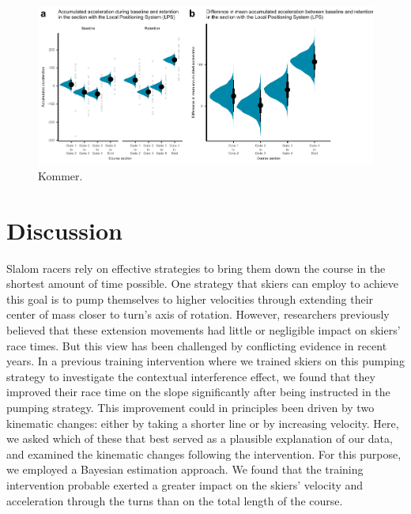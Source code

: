 \documentclass{article}
\begin{document}
\begin{figure}[H]
\centering
\includegraphics{figurer/figure_acc_acc.pdf}
\caption{Kommer.}\label{fig: accaccum}
\end{figure}

\section{Discussion}

Slalom racers rely on effective strategies to bring them down the course in the shortest amount of time possible. One strategy that skiers can employ to achieve this goal is to pump themselves to higher velocities through extending their center of mass closer to turn's axis of rotation. However, researchers previously believed that these extension movements had little or negligible impact on skiers' race times. But this view has been challenged by conflicting evidence in recent years. In a previous training intervention where we trained skiers on this pumping strategy to investigate the contextual interference effect, we found that they improved their race time on the slope significantly after being instructed in the pumping strategy. This improvement could in principles been driven by two kinematic changes: either by taking a shorter line or by increasing velocity. Here, we asked which of these that best served as a plausible explanation of our data, and examined the kinematic changes following the intervention. For this purpose, we employed a Bayesian estimation approach. We found that the training intervention probable exerted a greater impact on the skiers' velocity and acceleration through the turns than on the total length of the course. 
\end{document}
